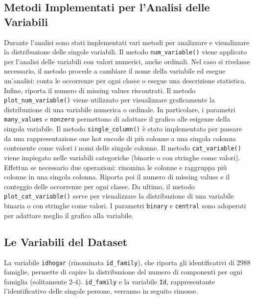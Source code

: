 \subsection{Metodi Implementati per l'Analisi delle Variabili}
Durante l'analisi sono stati implementati vari metodi per analizzare e visualizzare la distribuzione delle singole variabili. 
Il metodo \texttt{num\_variable()} viene applicato per l'analisi delle variabili con valori numerici, anche ordinali. Nel caso si rivelasse necessario, il metodo procede a cambiare il nome della variabile ed esegue un'analisi: conta le occorrenze per ogni classe o esegue una descrizione statistica. Infine, riporta il numero di missing values riscontrati. 
Il metodo \texttt{plot\_num\_variable()} viene utilizzato per visualizzare graficamente la distribuzione di una variabile numerica o ordinale. In particolare, i parametri \texttt{many\_values} e \texttt{nonzero} permettono di adattare il grafico alle esigenze della singola variabile.
Il metodo \texttt{single\_column()} è stato implementato per passare da una rappresentazione one hot encode di più colonne a una singola colonna contenente come valori i nomi delle singole colonne. 
Il metodo \texttt{cat\_variable()} viene impiegato nelle variabili categoriche (binarie o con stringhe come valori). Effettua se necessario due operazioni: rinomina le colonne e raggruppa più colonne in una singola colonna. Riporta poi il numero di missing values e il conteggio delle occorrenze per ogni classe.
Da ultimo, il metodo \texttt{plot\_cat\_variable()} serve per visualizzare la distribuzione di una variabile binaria o con stringhe come valori. I parametri \texttt{binary} e \texttt{central} sono adoperati per adattare meglio il grafico alla variabile.

\subsection{Le Variabili del Dataset}

La variabile \texttt{idhogar} (rinominata \texttt{id\_family}), che riporta gli identificativi di 2988 famiglie, permette di capire la distribuzione del numero di componenti per ogni famiglia (solitamente 2-4).
\texttt{id\_family} e la variabile \texttt{Id}, rappresentante l'identificativo delle singole persone, verranno in seguito rimosse.

